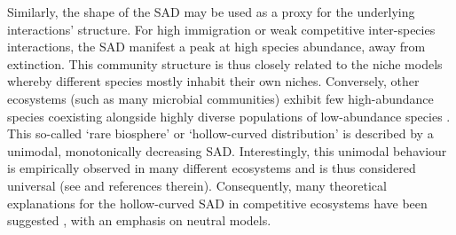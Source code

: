 \documentclass[9pt,twocolumn,twoside,lineno]{pnas-new}
\begin{document}

Similarly, the shape of the SAD may be used as a proxy for the underlying interactions' structure. 
For high immigration or weak competitive inter-species interactions, the SAD manifest a peak at high species abundance, away from extinction.
This community structure is thus closely related to the niche models whereby different species mostly inhabit their own niches.
Conversely, other ecosystems (such as many microbial communities) exhibit few high-abundance species coexisting alongside highly diverse populations of low-abundance species \cite{lynch2015ecology}.
This so-called `rare biosphere' or `hollow-curved distribution' is described by a unimodal, monotonically decreasing SAD.
Interestingly, this unimodal behaviour is empirically observed in many different ecosystems and is thus considered universal (see \cite{leidinger2017biodiversity} and references therein).
Consequently, many theoretical explanations for the hollow-curved SAD in competitive ecosystems have been suggested \cite{mcgill2007species,magurran2013measuring}, with an emphasis on neutral models.

\end{document}
